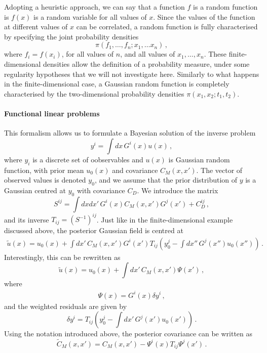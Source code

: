 Adopting a heuristic approach, we can say that a function $f$ is a random
function is $f(x)$ is a random variable for all values of $x$. Since the values
of the function at different values of $x$ can be correlated, a random function
is fully characterised by specifying the joint probability densities
\begin{equation}
  \label{eq:RandomFuncJointProb}
  \pi\left(
    f_1, \ldots, f_n; x_1, \ldots x_n
  \right)\, ,
\end{equation}
where $f_i=f(x_i)$, for all values of $n$, and all values of $x_1, \ldots, x_n$.
These finite-dimensional densities allow the definition of a probability
measure, under some regularity hypotheses that we will not investigate here.
Similarly to what happens in the finite-dimensional case, a Gaussian random
function is completely characterised by the two-dimensional probability
densities $\pi(x_1,x_2;t_1,t_2)$.

\paragraph{Functional linear problems} This formalism allows us to formulate a Bayesian solution of the inverse problem 
\begin{equation}
  \label{eq:BayesLinearInverse}
  y^i = \int dx\, G^i(x) u(x)\, ,
\end{equation}
where $y_i$ is a discrete set of oobservables and $u(x)$ is Gaussian random
function, with prior mean $u_0(x)$ and covariance $C_M(x,x')$. The vector of
observed values is denoted $y_0$, and we assume that the prior distribution of
$y$ is a Gaussian centred at $y_0$ with covariance $C_D$. We introduce the
matrix
\begin{equation}
  \label{eq:Smatrix}
  S^{ij} =
  \int dx dx'\, G^i(x) C_M(x,x') G^j(x') + C_D^{ij}\, ,
\end{equation}
and its inverse $T_{ij}=\left(S^{-1}\right)^{ij}$. Just like in the finite-dimensional example discussed above, the posterior Gaussian field is centred at
\begin{align}
  \label{eq:PostMeanFunc}
  \tilde{u}(x) = u_0(x) + 
  \int dx'\, C_M(x,x') G^i(x') T_{ij} \left(
    y_0^j - \int dx''\, G^j(x'') u_0(x'') 
  \right)\, .
\end{align}
Interestingly, this can be rewritten as
\begin{equation}
  \label{eq:TowardsBackus}
  \tilde{u}(x) = u_0(x) + 
  \int dx'\, C_M(x,x') \Psi(x')\, ,
\end{equation}
where 
\begin{eqnarray}
  \label{eq:PsiDef}
  \Psi(x) = G^i(x) \delta y^i\, ,
\end{eqnarray}
and the weighted residuals are given by
\begin{equation}
  \label{eq:DeltaYDef}
  \delta y^i = T_{ij} \left(
  y_0^j - \int dx'\, G^j(x') u_0(x')
  \right)\, .
\end{equation}
Using the notation introduced above, the posterior covariance can be written as
\begin{equation}
  \label{eq:PostCovFunc}
  \tilde{C}_M(x,x') = 
  C_M(x,x') - \Psi^i(x) T_{ij} \Psi^j(x')\, .
\end{equation}

